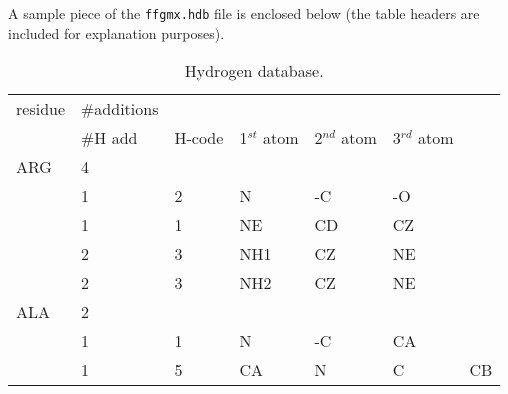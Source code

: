 A sample piece of the {\tt ffgmx.hdb} file is enclosed below (the
table headers are included for explanation purposes).
\begin{table}[ht]
\begin{tabular}{lllllll}
residue        & \#additions        &        &                &                &     
   \\
        & \#H add         & H-code& 1$^{st}$ atom        & 2$^{nd}$ atom        & 3$^
{rd}$ atom        \\
\hline
ARG     & 4	&	&  	&	&	&	\\
        & 1	& 2     & N     & -C	& -O	&     	\\
        & 1	& 1     & NE    & CD	& CZ	&    	\\
        & 2	& 3     & NH1   & CZ	& NE	&   	\\
        & 2	& 3     & NH2   & CZ	& NE	& 	\\
ALA 	& 2	& 	&	&	&	&	\\
	& 1	& 1	& N	& -C	& CA	&	\\
	& 1	& 5	& CA	& N	& C	& CB
\end{tabular}
\caption{Hydrogen database.}
\end{table}

